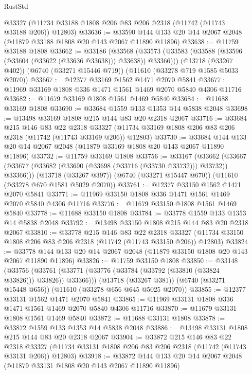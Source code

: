 \begin{lexlean}{RustStd}
\begin{coremodule}
    @33327
    (@11734 @33188 @1808 @206 @83 @206 @2318 (@11742 (@11743 @33188 @206)) @12803)
@33636 := @33590 @144 @133 @20 @14 @2067 @2048 (@11879 @33188 @1808 @20 @143 @2067 @11890 @11896)
@33638 := @11759 @33188 @1808
@33662 := @33186
    (@33568 (@33573 (@33583 (@33588 (@33596 (@33604 (@33622 (@33636 @33638))) @33638)) @33366)))
    (@13718 (@33267 @402))
    (@6740 (@33271 @15446 @719))
    (@11610 (@33278 @719 @1585 @5033 @2070))
@33667 := @12377 @33169 @1562 @1471 @2070 @5841
@33677 := @11969 @33169 @1808 @336 @1471 @1561 @1469 @2070 @5840 @4306 @11716
@33682 := @11679 @33169 @1808 @1561 @1469 @5840
@33684 := @11688 @33169 @1808
@33690 := @33684 @1559 @133 @1353 @14 @5838 @2048
@33698 := @13498 @33169 @1808 @215 @144 @83 @20 @2318 @2067
@33716 := @33684
    @215
    @146
    @83
    @22
    @2318
    @33327
    (@11734 @33169 @1808 @206 @83 @206 @2318 (@11742 (@11743 @33169 @206)) @12803)
@33730 := @33684 @144 @133 @20 @14 @2067 @2048 (@11879 @33169 @1808 @20 @143 @2067 @11890 @11896)
@33732 := @11759 @33169 @1808
@33756 := @33167
    (@33662 (@33667 (@33677 (@33682 (@33690 (@33698 (@33716 (@33730 @33732))) @33732)) @33366)))
    (@13718 (@33267 @397))
    (@6740 (@33271 @15447 @670))
    (@11610 (@33278 @670 @1581 @5029 @2070))
@33761 := @12377 @33150 @1562 @1471 @2070 @5841
@33771 := @11969 @33150 @1808 @336 @1471 @1561 @1469 @2070 @5840 @4306 @11716
@33776 := @11679 @33150 @1808 @1561 @1469 @5840
@33778 := @11688 @33150 @1808
@33784 := @33778 @1559 @133 @1353 @14 @5838 @2048
@33792 := @13498 @33150 @1808 @215 @144 @83 @20 @2318 @2067
@33810 := @33778
    @215
    @146
    @83
    @22
    @2318
    @33327
    (@11734 @33150 @1808 @206 @83 @206 @2318 (@11742 (@11743 @33150 @206)) @12803)
@33824 := @33778 @144 @133 @20 @14 @2067 @2048 (@11879 @33150 @1808 @20 @143 @2067 @11890 @11896)
@33826 := @11759 @33150 @1808
@33850 := @33148
    (@33756 (@33761 (@33771 (@33776 (@33784 (@33792 (@33810 (@33824 @33826))) @33826)) @33366)))
    (@13718 (@33267 @381))
    (@6740 (@33271 @15448 @656))
    (@11610 (@33278 @656 @645 @5025 @2070))
@33855 := @12377 @33131 @1562 @1471 @2070 @5841
@33865 := @11969 @33131 @1808 @336 @1471 @1561 @1469 @2070 @5840 @4306 @11716
@33870 := @11679 @33131 @1808 @1561 @1469 @5840
@33872 := @11688 @33131 @1808
@33878 := @33872 @1559 @133 @1353 @14 @5838 @2048
@33886 := @13498 @33131 @1808 @215 @144 @83 @20 @2318 @2067
@33904 := @33872
    @215
    @146
    @83
    @22
    @2318
    @33327
    (@11734 @33131 @1808 @206 @83 @206 @2318 (@11742 (@11743 @33131 @206)) @12803)
@33918 := @33872 @144 @133 @20 @14 @2067 @2048 (@11879 @33131 @1808 @20 @143 @2067 @11890 @11896)

\end{coremodule}
\end{lexlean}
